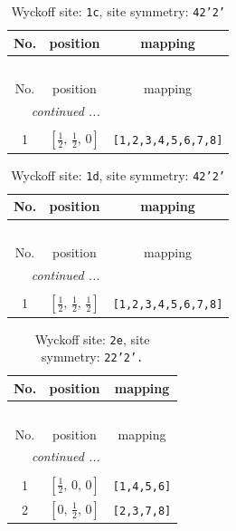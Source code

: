 \documentclass[fleqn,8pt]{jsarticle}
\begin{document}
\begin{longtable}{ccc}
\caption{Wyckoff site: {\tt 1c}, site symmetry: {\tt 42'2'}}
 \\
 \hline \hline
No. & position & mapping \\ \hline \endfirsthead

\multicolumn{2}{l}{\tablename\ \thetable{}} \\
 \hline \hline
No. & position & mapping \\ \hline \endhead

 \hline \hline
\multicolumn{2}{r}{\footnotesize\it continued ...} \\ \endfoot

 \hline \hline
\multicolumn{2}{r}{} \\ \endlastfoot

1 & $\left[ \frac{1}{2},\, \frac{1}{2},\, 0 \right]$ & {\tt [1,2,3,4,5,6,7,8]} \\
\end{longtable}
\renewcommand{\arraystretch}{1.2}
\begin{longtable}{ccc}
\caption{Wyckoff site: {\tt 1d}, site symmetry: {\tt 42'2'}}
 \\
 \hline \hline
No. & position & mapping \\ \hline \endfirsthead

\multicolumn{2}{l}{\tablename\ \thetable{}} \\
 \hline \hline
No. & position & mapping \\ \hline \endhead

 \hline \hline
\multicolumn{2}{r}{\footnotesize\it continued ...} \\ \endfoot

 \hline \hline
\multicolumn{2}{r}{} \\ \endlastfoot

1 & $\left[ \frac{1}{2},\, \frac{1}{2},\, \frac{1}{2} \right]$ & {\tt [1,2,3,4,5,6,7,8]} \\
\end{longtable}
\renewcommand{\arraystretch}{1.2}
\begin{longtable}{ccc}
\caption{Wyckoff site: {\tt 2e}, site symmetry: {\tt 22'2'.}}
 \\
 \hline \hline
No. & position & mapping \\ \hline \endfirsthead

\multicolumn{2}{l}{\tablename\ \thetable{}} \\
 \hline \hline
No. & position & mapping \\ \hline \endhead

 \hline \hline
\multicolumn{2}{r}{\footnotesize\it continued ...} \\ \endfoot

 \hline \hline
\multicolumn{2}{r}{} \\ \endlastfoot

1 & $\left[ \frac{1}{2},\, 0,\, 0 \right]$ & {\tt [1,4,5,6]} \\ \hline
2 & $\left[ 0,\, \frac{1}{2},\, 0 \right]$ & {\tt [2,3,7,8]} \\
\end{longtable}
\end{document}
